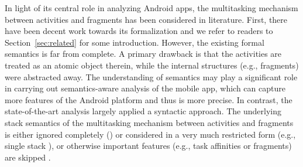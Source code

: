 In light of its central role in %
analyzing Android apps, the multitasking mechanism between activities and fragments has been considered in literature.
First, there have been decent work towards its formalization and we refer to readers to Section~\ref{sec:related} for some introduction. %
However, the existing formal semantics is far from complete. A primary drawback is that the activities are treated as an atomic object therein, while the internal structures (e.g., fragments) were abstracted away. 
The understanding of semantics may play a significant role in carrying out semantics-aware analysis of the mobile app, which can capture more features of the Android platform and thus is more precise. In contrast, 
the state-of-the-art analysis largely applied a syntactic approach. The underlying stack semantics of the multitasking mechanism between activities and fragments is either ignored completely (\cite{AN13,LWX18,CHGD18}) or considered in a very much restricted form (e.g., single stack \cite{YZWWYR15}), or otherwise important features (e.g., task affinities or fragments) are skipped \cite{YZWWYR15,YWYZ17, ZSX18}.  
%

